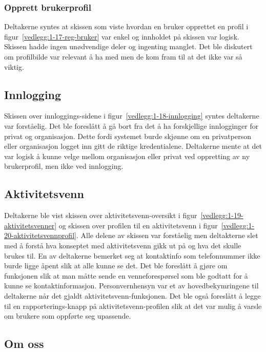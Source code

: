 \subsubsection{Opprett brukerprofil}

Deltakerne syntes at skissen som viste hvordan en bruker opprettet en profil i figur~\ref{vedlegg:1-17-reg-bruker} var enkel og innholdet på skissen var logisk. Skissen hadde ingen unødvendige deler og ingenting manglet. Det ble diskutert om profilbilde var relevant å ha med men de kom fram til at det ikke var så viktig. 


\subsection{Innlogging}

Skissen over innloggings-sidene i figur~\ref{vedlegg:1-18-innlogging} syntes deltakerne var forståelig. Det ble foreslått å gå bort fra det å ha forskjellige innlogginger for privat og organisasjon. Dette fordi systemet burde skjønne om en privatperson eller organisasjon logget inn gitt de riktige kredentialene. Deltakerne mente at det var logisk å kunne velge mellom organisasjon eller privat ved oppretting av ny brukerprofil, men ikke ved innlogging.


\subsection{Aktivitetsvenn}

Deltakerne ble vist skissen over aktivitetsvenn-oversikt i figur~\ref{vedlegg:1-19-aktivitetsvenner} og skissen over profilen til en aktivitetsvenn i figur~\ref{vedlegg:1-20-aktivitetsvennprofil}. Alle delene av skissen var forståelig men deltakterne slet med å forstå hva konseptet med aktivitetsvenn gikk ut på og hva det skulle brukes til. En av deltakerne bemerket seg at kontaktinfo som telefonnummer ikke burde ligge åpent slik at alle kunne se det. Det ble foreslått å gjøre om funksjonen slik at man måtte sende en venneforespørsel som ble godtatt for å kunne se kontaktinformasjon. Personvernhensyn var et av hovedbekymringene til deltakerne når det gjaldt aktivitetsvenn-funksjonen. Det ble også foreslått å legge til en rapporterings-knapp på aktivitetsvenn-profilen slik at det var mulig å varsle om brukere som oppførte seg upassende.


\subsection{Om oss}

